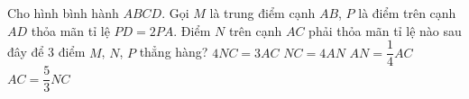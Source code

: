 \begin{ex} %
	Cho hình bình hành $ABCD$. Gọi $M$ là trung điểm cạnh $AB$, $P$ là điểm trên cạnh $AD$ thỏa mãn tỉ lệ $PD=2PA$. Điểm $N$ trên cạnh $AC$ phải thỏa mãn tỉ lệ nào sau đây để 3 điểm $M$, $N$, $P$ thẳng hàng?
	\choice
	{$4NC=3AC$}
	{\True $NC=4AN$}
	{$AN=\dfrac{1}{4}AC$}
	{$AC=\dfrac{5}{3}NC$}
\end{ex}

